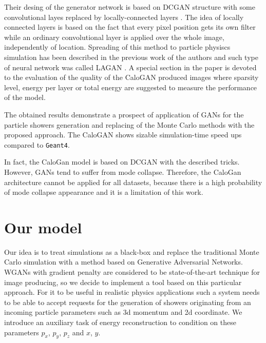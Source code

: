 \documentclass{webofc}
\newcommand{\geant}{{\texttt{Geant4}}}
\begin{document}
Their desing of the generator network is based on DCGAN structure \cite{radford2015unsupervised} with some convolutional layes replaced by locally-connected layers \cite{taigman2014deepface}. The idea of locally connected layers is based on the fact that every pixel position gets its own filter while an ordinary convolutional layer is applied over the whole image, independently of location. Spreading of this method to particle physiscs simulation has been described in the previous work of the authors and such type of neural network was called LAGAN \cite{de2017learning}. A special section in the paper is devoted to the evaluation of the quality of the CaloGAN produced images where  sparsity level,  energy per layer or total energy are suggested to measure the performance of the model. 

The obtained results demonstrate a prospect of application of GANs for the particle showers generation and replacing of the Monte Carlo methods with the proposed approach. The CaloGAN shows sizable simulation-time speed ups compared to \geant. 

In fact, the CaloGan model is based on DCGAN with the described tricks. However, GANs tend to suffer from mode collapse. Therefore, the CaloGan architecture cannot be applied for all datasets, because there is a high probability of mode collapse appearance and it is a limitation of this work.

\section{Our model} \label{sec:model}
Our idea is to treat simulations as a black-box and replace the traditional Monte Carlo simulation with a method based on Generative Adversarial Networks. WGANs with gradient penalty are considered to be state-of-the-art technique for image producing, so we decide to implement a tool based on this particular approach. For it to be useful in realistic physics applications such a system needs to be able to accept requests for the generation of showers originating from an incoming particle parameters such as 3d momentum and 2d coordinate. We introduce an auxiliary task of energy reconstruction to condition on these parameters $p_x$, $p_y$, $p_z$ and $x$, $y$.
\end{document}

